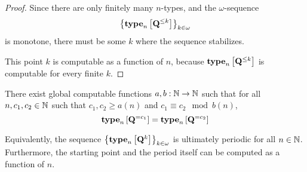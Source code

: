 \begin{proof}
  Since there are only finitely many $n$-types,
  and the $\omega$-sequence \[\left\{ {\mathbf{type}_{n} \left[ {\mathbf{Q}^{\le k}} \right]} \right\}_{k \in \omega}\]
  is monotone,
  there must be some $k$ where the sequence stabilizes.

  This point $k$ is computable as a function of $n$, because
  $\mathbf{type}_{n} \left[ {\mathbf{Q}^{\le k}} \right]$ is computable for every finite $k$.
\end{proof}

\begin{lemma}\label{ab-lemma}
  There exist global computable functions $a, b : \mathbb{N} \to \mathbb{N}$ such that
  for all $n, c_1, c_2 \in \mathbb{N}$ such that $c_1, c_2 \ge a(n)$ and $c_1 \equiv c_2 \mod b(n)$,
  \[\mathbf{type}_{n} \left[ {\mathbf{Q}^{= c_1}} \right] = \mathbf{type}_{n} \left[ {\mathbf{Q}^{= c_2}} \right]\]

  Equivalently, the sequence $\left\{ {\mathbf{type}_{n} \left[ {\mathbf{Q}^{k}} \right]} \right\}_{k \in \omega}$
  is ultimately periodic for all $n \in \mathbb{N}$. Furthermore, the starting point and the period
  itself can be computed as a function of $n$.
\end{lemma}


